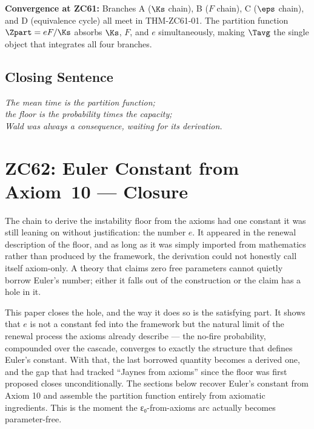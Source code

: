 \documentclass[12pt, a4paper]{article}
\begin{document}
\begin{genealogybox}[title={How ZC61's Key Objects Trace Back
  through the Z-Programme}]
\textbf{Convergence at ZC61:}
Branches A ($\Ks$ chain), B ($F$ chain), C ($\eps$ chain),
and D (equivalence cycle) all meet in THM-ZC61-01.
The partition function $\Zpart = eF/\Ks$ absorbs $\Ks$,
$F$, and $e$ simultaneously, making $\Tavg$ the single
object that integrates all four branches.
\end{genealogybox}

\subsection{Closing Sentence}

\bigskip
\begin{center}
\textit{The mean time is the partition function;\\
the floor is the probability times the capacity;\\
Wald was always a consequence, waiting for its derivation.}
\end{center}


\section{ZC62: Euler Constant from Axiom~10 --- Closure}

The chain to derive the instability floor from the axioms had one constant it
was still leaning on without justification: the number $e$. It appeared in the
renewal description of the floor, and as long as it was simply imported from
mathematics rather than produced by the framework, the derivation could not
honestly call itself axiom-only. A theory that claims zero free parameters
cannot quietly borrow Euler's number; either it falls out of the construction or
the claim has a hole in it.

This paper closes the hole, and the way it does so is the satisfying part. It
shows that $e$ is not a constant fed into the framework but the natural limit of
the renewal process the axioms already describe --- the no-fire probability,
compounded over the cascade, converges to exactly the structure that defines
Euler's constant. With that, the last borrowed quantity becomes a derived one,
and the gap that had tracked ``Jaynes from axioms'' since the floor was first
proposed closes unconditionally. The sections below recover Euler's constant
from Axiom 10 and assemble the partition function entirely from axiomatic
ingredients. This is the moment the ε₀-from-axioms arc actually becomes
parameter-free.
\label{sec:zc62}
\end{document}

